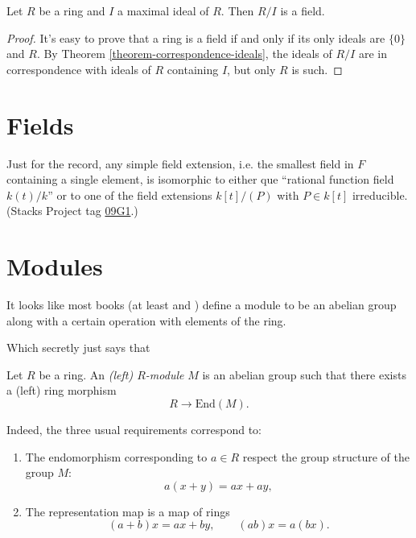 \begin{lemma}
\label{lemma-quotient-ring-maximal-ideal-is-field}
Let $R$ be a ring and $I$ a maximal ideal of $R$.
Then $R/I$ is a field.
\end{lemma}

\begin{proof}
It's easy to prove that a ring is a field if and only if its
only ideals are $\{0\}$ and $R$. By Theorem \ref{theorem-correspondence-ideals},
the ideals of $R/I$ are in correspondence with ideals of $R$ containing $I$,
but only $R$ is such.
\end{proof}

\section{Fields}
\label{section-fields}

\noindent
Just for the record, any simple field extension, i.e. the smallest
field in $F$ containing a single element, is isomorphic
to either que ``rational function field $k(t)/k$''
or to one of the field extensions $k[t]/(P)$ 
with $P \in k[t]$ irreducible.
(Stacks Project tag \href{https://stacks.math.columbia.edu/tag/09G1}{09G1}.)

\section{Modules}
\label{section-modules}

It looks like most books (at least
\cite{eis} and \cite{Samuel-Zariski-Vol1})
define a module to be an abelian group
along with a certain operation with
elements of the ring.

Which secretly just says that

\begin{definition}
\label{definition-module}
Let $R$ be a ring.
An {\it (left) $R$-module} $M$ is an abelian group
such that there exists a (left) ring morphism
$$
R \to \text{End}(M).
$$
\end{definition}

\noindent
Indeed, the three usual requirements
correspond to:

\begin{enumerate}
\item The endomorphism corresponding to $a \in R$ 
respect the group structure of the group $M$:
$$
a(x+y)=ax+ay,
$$

\item The representation map is a map of rings
$$
(a+b)x=ax+by,\qquad (ab)x=a(bx).
$$
\end{enumerate}

